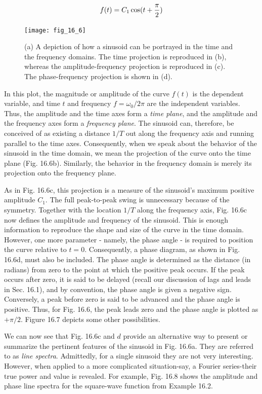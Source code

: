 \documentclass[../main.tex]{subfiles}
\begin{document}
\begin{equation}
	\notag
	f(t) = C_1 \cos(t + \frac{\pi}{2})
\end{equation} 

\begin{figure}[H] 
	\centering
	\texttt{[image: fig\_16\_6]}
	\caption{\textsf{(a) A depiction of how a sinusoid can be portrayed in the time and the frequency domains. The
	time projection is reproduced in (b), whereas the amplitude-frequency projection is reproduced in
	(c). The phase-frequency projection is shown in (d).}}
	\label{fig:fig_16_6}
\end{figure}

\noindent In this plot, the magnitude or amplitude of the curve $f(t)$ is the dependent variable, and time $t$
and frequency $f = \omega_0 / 2 \pi$ are the independent variables. Thus, the amplitude and the time
axes form a \textit{time plane}, and the amplitude and the frequency axes form a \textit{frequency plane}.
The sinusoid can, therefore, be conceived of as existing a distance $1/T$ out along the frequency axis and running parallel to the time axes. Consequently, when we speak about the
behavior of the sinusoid in the time domain, we mean the projection of the curve onto the
time plane (Fig. 16.6b). Similarly, the behavior in the frequency domain is merely its projection onto the frequency plane.

As in Fig. 16.6c, this projection is a measure of the sinusoid's maximum positive
amplitude $C_1$. The full peak-to-peak swing is unnecessary because of the symmetry.
Together with the location $1/T$ along the frequency axis, Fig. 16.6c now defines the
amplitude and frequency of the sinusoid. This is enough information to reproduce the
shape and size of the curve in the time domain. However, one more parameter - namely,
the phase angle - is required to position the curve relative to $t = 0$. Consequently, a
phase diagram, as shown in Fig. 16.6d, must also be included. The phase angle is determined as the distance (in radians) from zero to the point at which the positive peak
occurs. If the peak occurs after zero, it is said to be delayed (recall our discussion of lags
and leads in Sec. 16.1), and by convention, the phase angle is given a negative sign.
Conversely, a peak before zero is said to be advanced and the phase angle is positive.
Thus, for Fig. 16.6, the peak leads zero and the phase angle is plotted as $+\pi / 2$. Figure 16.7 depicts some other possibilities.

We can now see that Fig. 16.6c and $d$ provide an alternative way to present or summarize the pertinent features of the sinusoid in Fig. 16.6a. They are referred to as \textit{line spectra}.
Admittedly, for a single sinusoid they are not very interesting. However, when applied to a
more complicated situation-say, a Fourier series-their true power and value is revealed.
For example, Fig. 16.8 shows the amplitude and phase line spectra for the square-wave
function from Example 16.2.
\end{document}
